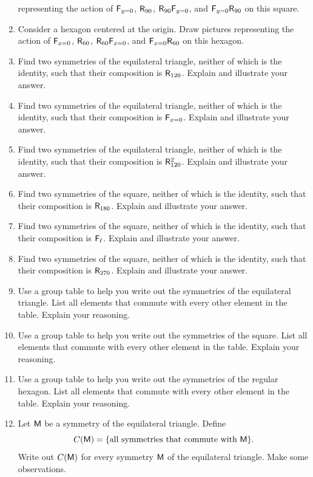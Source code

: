 \begin{problems}
\begin{enumerate}
  representing the action of $\mathsf{F}_{y=0}$, $\mathsf{R}_{90}$,
  $\mathsf{R}_{90}\mathsf{F}_{y=0}$, and $\mathsf{F}_{y=0} \mathsf{R}_{90}$ on
  this square.
\item Consider a hexagon centered at the origin. Draw pictures
  representing the action of $\mathsf{F}_{x=0}$, $\mathsf{R}_{60}$,
  $\mathsf{R}_{60}\mathsf{F}_{x=0}$, and $\mathsf{F}_{x=0} \mathsf{R}_{60}$ on
  this hexagon.
\item Find two symmetries of the equilateral triangle, neither of
  which is the identity, such that their composition is
  $\mathsf{R}_{120}$. Explain and illustrate your answer.
\item Find two symmetries of the equilateral triangle, neither of
  which is the identity, such that their composition is
  $\mathsf{F}_{x=0}$. Explain and illustrate your answer.
\item Find two symmetries of the equilateral triangle, neither of
  which is the identity, such that their composition is
  $\mathsf{R}_{120}^2$. Explain and illustrate your answer.
\item Find two symmetries of the square, neither of which is the
  identity, such that their composition is $\mathsf{R}_{180}$. Explain
  and illustrate your answer.
\item Find two symmetries of the square, neither of which is the
  identity, such that their composition is $\mathsf{F}_{\ell}$. Explain
  and illustrate your answer.
\item Find two symmetries of the square, neither of which is the
  identity, such that their composition is $\mathsf{R}_{270}$. Explain
  and illustrate your answer.
\item Use a group table to help you write out the symmetries of the
  equilateral triangle. List all elements that commute with every
  other element in the table. Explain your reasoning.
\item Use a group table to help you write out the symmetries of the
  square. List all elements that commute with every other element in
  the table. Explain your reasoning.
\item Use a group table to help you write out the symmetries of the
  regular hexagon. List all elements that commute with every other
  element in the table. Explain your reasoning.
\item Let $\mathsf{M}$ be a symmetry of the equilateral triangle. Define
\[
C(\mathsf{M}) = \{\text{all symmetries that commute with $\mathsf{M}$}\}.
\]
Write out $C(\mathsf{M})$ for every symmetry $\mathsf{M}$ of the equilateral
triangle. Make some observations.
\end{enumerate}
\end{problems}

